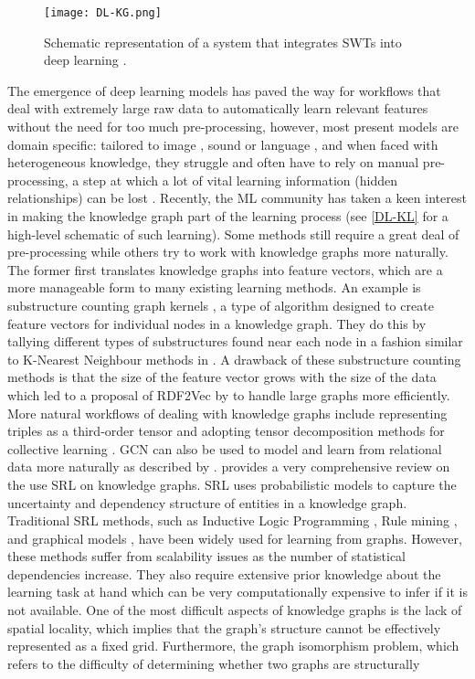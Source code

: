 \begin{figure}[t]
	\centering
	\texttt{[image: DL-KG.png]}
	\caption{Schematic representation of a system that integrates \acp{SWT} into deep learning \citep{Futia2020OnResearch}.} 
	\label{DL-KL}
\end{figure}

The emergence of deep learning models has paved the way for workflows that deal with extremely large raw data to automatically learn relevant features without the need for too much pre-processing, however, most present models are domain specific: tailored to image \citep{Cun1990, Krizhevsky, Le2013, Lowe1999}, sound or language \citep{Graves2013, Nguyen2015}, and when faced with heterogeneous knowledge, they struggle and often have to rely on manual pre-processing, a step at which a lot of vital learning information (hidden relationships) can be lost \citep{Wilcke2017}. Recently, the \ac{ML} community has taken a keen interest in making the knowledge graph part of the learning process (see \autoref{DL-KL} for a high-level schematic of such learning). Some methods still require a great deal of pre-processing while others try to work with knowledge graphs more naturally. The former first translates knowledge graphs into feature vectors, which are a more manageable form to many existing learning methods. An example is substructure counting graph kernels \citep{Losch2012}, a type of algorithm designed to create feature vectors for individual nodes in a knowledge graph. They do this by tallying different types of substructures found near each node in a fashion similar to K-Nearest Neighbour methods in \cite{Cunningham2007}. A drawback of these substructure counting methods is that the size of the feature vector grows with the size of the data which led to a proposal of RDF2Vec by \cite{Ristoski2016} to handle large graphs more efficiently. More natural workflows of dealing with knowledge graphs include representing triples as a third-order tensor and adopting tensor decomposition methods for collective learning \citep{Kolda2009TensorApplications, Nickel2013TensorLearning}. \ac{GCN} \citep{Kipf2016} can also be used to model and learn from relational data more naturally as described by \cite{Schlichtkrull2017}. \cite{Nickel2016} provides a very comprehensive review on the use \ac{SRL} on knowledge graphs. \ac{SRL} uses probabilistic models to capture the uncertainty and dependency structure of entities in a knowledge graph. Traditional \ac{SRL} methods, such as Inductive Logic Programming \citep{Muggleton1994InductiveMethods}, Rule mining \citep{Volker2011StatisticalInduction}, and graphical models \cite{Wainwright2008GraphicalInference}, have been widely used for learning from graphs. However, these methods suffer from scalability issues as the number of statistical dependencies increase. They also require extensive prior knowledge about the learning task at hand which can be very computationally expensive to infer if it is not available. One of the most difficult aspects of knowledge graphs is the lack of spatial locality, which implies that the graph's structure cannot be effectively represented as a fixed grid. Furthermore, the graph isomorphism problem, which refers to the difficulty of determining whether two graphs are structurally 